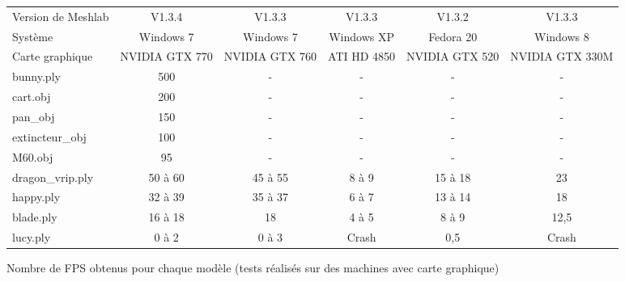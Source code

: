 \begin{figure}
  \begin{changemargin}{-4cm}{-4cm}
    \centering
    \begin{tabular}{|l|c|c|c|c|c|}
      \hline
      Version de Meshlab & V1.3.4 & V1.3.3 & V1.3.3 & V1.3.2 & V1.3.3 \\
      Système & Windows 7 & Windows 7 & Windows XP & Fedora 20 & Windows 8 \\
      Carte graphique & NVIDIA GTX 770 & NVIDIA GTX 760 & ATI HD 4850 & NVIDIA GTX 520 & NVIDIA GTX 330M \\ \hline \hline
      bunny.ply & 500 & - & - & - & - \\ \hline
      cart.obj & 200 & - & - & - & - \\ \hline
      pan\_obj & 150 & - & - & - & - \\ \hline
      extincteur\_obj & 100 & - & - & - & - \\ \hline
      M60.obj & 95 & - & - & - & - \\ \hline
      dragon\_vrip.ply & 50 à 60 & 45 à 55 & 8 à 9 & 15 à 18 & 23 \\ \hline
      happy.ply & 32 à 39 & 35 à 37 & 6 à 7 & 13 à 14 & 18 \\ \hline
      blade.ply & 16 à 18 & 18 & 4 à 5 & 8 à 9 & 12,5 \\ \hline
      lucy.ply & 0 à 2 & 0 à 3 & Crash & 0,5 & Crash \\ \hline
    \end{tabular}
  \end{changemargin}
  \caption{Nombre de FPS obtenus pour chaque modèle (tests réalisés sur des machines avec carte graphique)}
  \label{tab:aveccg}
\end{figure}
